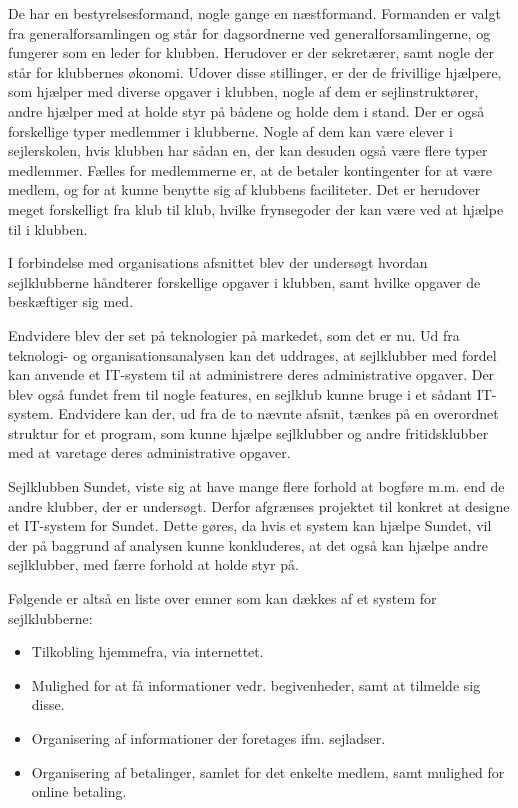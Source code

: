 De har en bestyrelsesformand, nogle gange en næstformand. Formanden er valgt fra generalforsamlingen og står for
dagsordnerne ved generalforsamlingerne, og fungerer som en leder for klubben. Herudover er der sekretærer, samt nogle
der står for klubbernes økonomi. Udover disse stillinger, er der de frivillige hjælpere, som hjælper med diverse opgaver
i klubben, nogle af dem er sejlinstruktører, andre hjælper med at holde styr på bådene og holde dem i stand. Der er også
forskellige typer medlemmer i klubberne. Nogle af dem kan være elever i sejlerskolen, hvis klubben har sådan en, der kan
desuden også være flere typer medlemmer. Fælles for medlemmerne er, at de betaler kontingenter for at være medlem, og for
at kunne benytte sig af klubbens faciliteter. Det er herudover meget forskelligt fra klub til klub, hvilke frynsegoder
der kan være ved at hjælpe til i klubben.

I forbindelse med organisations afsnittet blev der undersøgt hvordan sejlklubberne håndterer forskellige opgaver i klubben, samt hvilke opgaver de beskæftiger sig med. 

Endvidere blev der set på teknologier på markedet, som det er nu. Ud fra teknologi- og organisationsanalysen kan det
uddrages, at sejlklubber med fordel kan anvende et IT-system til at administrere deres administrative opgaver. Der blev
også fundet frem til nogle features, en sejlklub kunne bruge i et sådant IT-system. Endvidere kan der, ud fra de to
nævnte afsnit, tænkes på en overordnet struktur for et program, som kunne hjælpe sejlklubber og andre fritidsklubber med
at varetage deres administrative opgaver.

Sejlklubben Sundet, viste sig at have mange flere forhold at bogføre m.m. end de andre klubber, der er undersøgt. Derfor afgrænses projektet til konkret at designe et IT-system for Sundet. Dette gøres, da hvis et system kan hjælpe Sundet, vil der på baggrund af analysen kunne konkluderes, at det også kan hjælpe andre sejlklubber, med færre forhold at holde styr på. 

Følgende er altså en liste over emner som kan dækkes af et system for sejlklubberne:

\begin{itemize}
	\item Tilkobling hjemmefra, via internettet.
	\item Mulighed for at få informationer vedr. begivenheder, samt at tilmelde sig disse.
	\item Organisering af informationer der foretages ifm. sejladser.
	\item Organisering af betalinger, samlet for det enkelte medlem, samt mulighed for online betaling.
\end{itemize}

